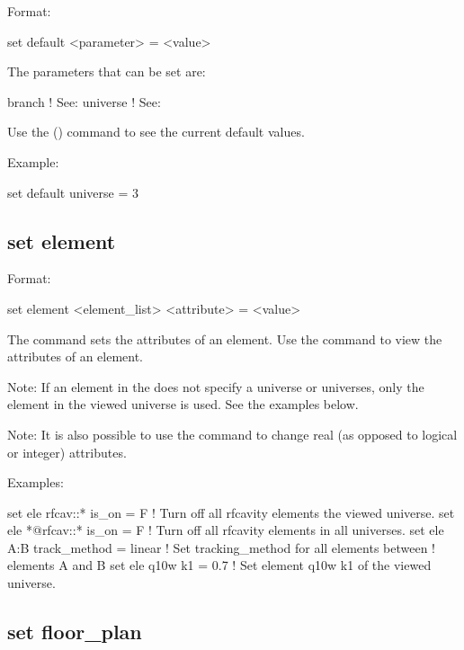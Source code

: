 {{Format:
\begin{example}
  set default <parameter> = <value>
\end{example}

The parameters that can be set are:
\begin{example}
  branch            ! See: 
  universe          ! See: 
\end{example}

Use the  () command to see the current
default values.

Example:
\begin{example}
  set default universe = 3
\end{example}


\subsection{set element}
\label{s:set.element}

Format:
\begin{example}
  set element <element_list> <attribute> = <value>
\end{example}

The  command sets the attributes of an element. Use the 
command to view the attributes of an element.

Note: If an element in the  does not specify a universe or universes,
only the element in the viewed universe is used. See the examples below.

Note: It is also possible to use the  command to change
real (as opposed to logical or integer) attributes.

Examples:
\begin{example}
  set ele rfcav::* is_on = F        ! Turn off all rfcavity elements the viewed universe.
  set ele *@rfcav::* is_on = F      ! Turn off all rfcavity elements in all universes.
  set ele A:B track_method = linear ! Set tracking_method for all elements between 
                                    !   elements A and B
  set ele q10w k1 = 0.7             ! Set element q10w k1 of the viewed universe.
\end{example}


\subsection{set floor_plan}
\label{s:set.floor.plan}

}}
